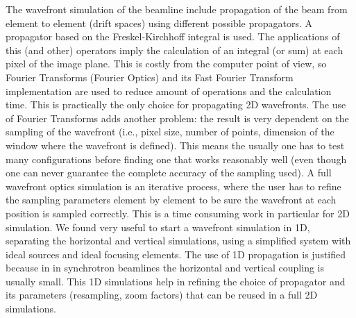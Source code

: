 \documentclass{iucr}              %
\begin{document}
The wavefront simulation of the beamline include propagation of the beam from element to element (drift spaces) using different possible propagators. A propagator based on the Freskel-Kirchhoff integral is used. The applications of this (and other) operators imply the calculation of an integral (or sum) at each pixel of the image plane. This is costly from the computer point of view, so Fourier Transforms (Fourier Optics) and its Fast Fourier Transform implementation are used to reduce amount of operations and the calculation time. This is practically the only choice for propagating 2D wavefronts. The use of Fourier Transforms adds another problem: the result is very dependent on the sampling of the wavefront (i.e., pixel size, number of points, dimension of the window where the wavefront is defined). This means the usually one has to test many configurations before finding one that works reasonably well (even though one can never guarantee the complete accuracy of the sampling used). A full wavefront optics simulation is an iterative process, where the user has to refine the sampling parameters element by element to be sure the wavefront at each position is sampled correctly. This is a time consuming work in particular for 2D simulation. We found very useful to start a wavefront simulation in 1D, separating the horizontal and vertical simulations, using a simplified system with ideal sources and ideal focusing elements. The use of 1D propagation is justified because in in synchrotron beamlines the horizontal and vertical coupling is usually small. This 1D simulations help in refining the choice of propagator and its parameters (resampling, zoom factors) that can be reused in a full 2D simulations.
\end{document}
